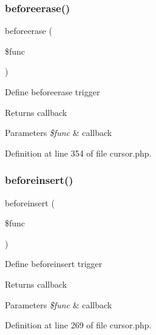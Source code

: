\hypertarget{class_d_b_1_1_cursor_a50acd223a47511be7b2e92dd1d504268}{}\label{class_d_b_1_1_cursor_a50acd223a47511be7b2e92dd1d504268} 
\subsubsection{\texorpdfstring{beforeerase()}{beforeerase()}}
{\footnotesize\ttfamily beforeerase (\begin{DoxyParamCaption}\item[{}]{\$func }\end{DoxyParamCaption})}

Define beforeerase trigger \begin{DoxyReturn}{Returns}
callback 
\end{DoxyReturn}

\begin{DoxyParams}{Parameters}
{\em \$func} & callback \\
\hline
\end{DoxyParams}


Definition at line 354 of file cursor.\+php.

\hypertarget{class_d_b_1_1_cursor_ae34d64fef3b7e4de2eede65ca67751d7}{}\label{class_d_b_1_1_cursor_ae34d64fef3b7e4de2eede65ca67751d7} 
\subsubsection{\texorpdfstring{beforeinsert()}{beforeinsert()}}
{\footnotesize\ttfamily beforeinsert (\begin{DoxyParamCaption}\item[{}]{\$func }\end{DoxyParamCaption})}

Define beforeinsert trigger \begin{DoxyReturn}{Returns}
callback 
\end{DoxyReturn}

\begin{DoxyParams}{Parameters}
{\em \$func} & callback \\
\hline
\end{DoxyParams}


Definition at line 269 of file cursor.\+php.

\hypertarget{class_d_b_1_1_cursor_a9d837ab7aea1a740986d5f6c0258b395}{}\label{class_d_b_1_1_cursor_a9d837ab7aea1a740986d5f6c0258b395} 

